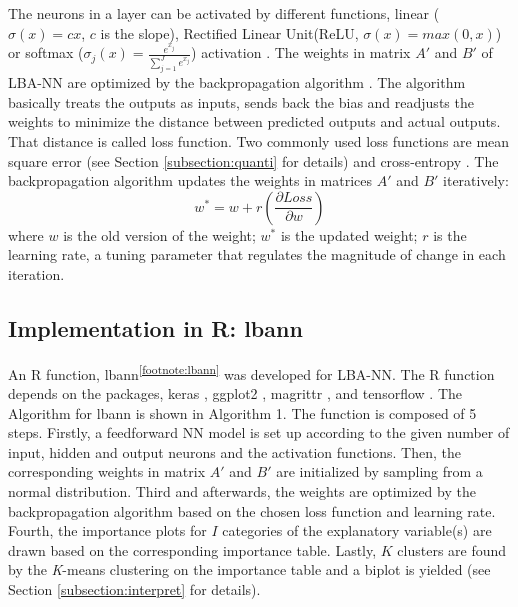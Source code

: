 \documentclass[]{interact}
\theoremstyle{plain}%
\theoremstyle{definition}
\theoremstyle{remark}
\begin{document}
The neurons in a layer can be activated by different functions, linear
(\(\sigma(x)=cx\), \(c\) is the slope), Rectified Linear Unit(ReLU,
\(\sigma(x)=max(0,x)\)) or softmax
(\(\sigma_j(x) = \frac{e^{x_j}}{\sum_{j=1}^J{e^{x_j}}}\)) activation
\citep{nwankpa2018}. The weights in matrix \(A'\) and \(B'\) of LBA-NN
are optimized by the backpropagation algorithm \citep{Rojas1996}. The
algorithm basically treats the outputs as inputs, sends back the bias
and readjusts the weights to minimize the distance between predicted
outputs and actual outputs. That distance is called loss function. Two
commonly used loss functions are mean square error (see Section
\ref{subsection:quanti} for details) \citep{allen1972} and cross-entropy
\citep{hui2021}. The backpropagation algorithm updates the weights in
matrices \(A'\) and \(B'\) iteratively: \begin{equation}
    w^* = w + r(\frac{\partial Loss}{\partial w}) \tag{3.2}
\end{equation} where \(w\) is the old version of the weight; \(w^*\) is
the updated weight; \(r\) is the learning rate, a tuning parameter that
regulates the magnitude of change in each iteration.

\hypertarget{subsection:function}{%
\subsection{\texorpdfstring{Implementation in R:
\textsf{lbann}}{Implementation in R: }}\label{subsection:function}}

An R function, \textsf{lbann}\textsuperscript{\ref{footnote:lbann}} was
developed for LBA-NN. The R function depends on the packages,
\textsf{keras} \citep{keras}, \textsf{ggplot2} \citep{ggplot2},
\textsf{magrittr} \citep{magrittr}, and \textsf{tensorflow}
\citep{tensorflow}. The Algorithm for \textsf{lbann} is shown in
Algorithm 1. The function is composed of 5 steps. Firstly, a feedforward
NN model is set up according to the given number of input, hidden and
output neurons and the activation functions. Then, the corresponding
weights in matrix \(A'\) and \(B'\) are initialized by sampling from a
normal distribution. Third and afterwards, the weights are optimized by
the backpropagation algorithm based on the chosen loss function and
learning rate. Fourth, the importance plots for \(I\) categories of the
explanatory variable(s) are drawn based on the corresponding importance
table. Lastly, \(K\) clusters are found by the \emph{K}-means clustering
on the importance table and a biplot is yielded (see Section
\ref{subsection:interpret} for details). \bigskip
\end{document}
